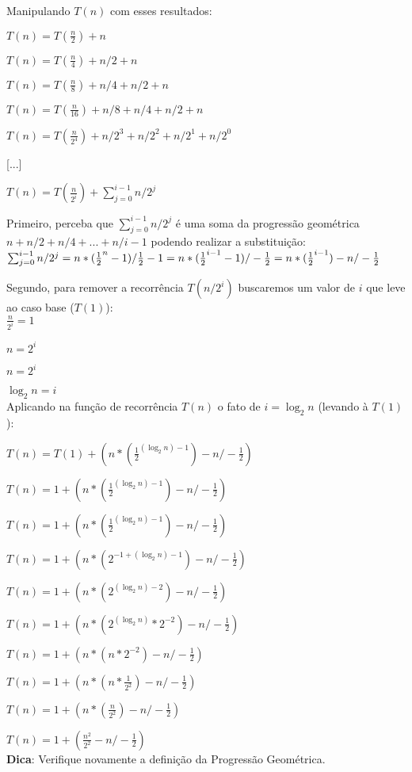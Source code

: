 \documentclass[a4paper, twocolumn]{article}
\theoremstyle{definition}
\begin{document}
Manipulando $T(n)$ com esses resultados:

$T(n) = T(\frac{n}{2}) + n$

$T(n) = T(\frac{n}{4}) + n/2 + n$

$T(n) = T(\frac{n}{8}) + n/4 + n/2 + n$

$T(n) = T(\frac{n}{16}) + n/8 + n/4 + n/2 + n$

$T(n) = T(\frac{n}{2^4}) + n/2^3 + n/2^2 + n/2^1 + n/2^0$

[...]

$T(n) = T(\frac{n}{2^i}) + \sum_{j=0}^{i-1} n/2^j$

Primeiro, perceba que $\sum_{j=0}^{i-1} n/2^j$ é uma soma da progressão geométrica $n + n/2 + n/4 + ... + n/i-1$ podendo realizar a substituição: \\

$ \sum_{j=0}^{i-1} n/2^j = n*(\frac{1}{2}^n - 1) / \frac{1}{2} - 1 \\
= n*(\frac{1}{2}^{i-1} - 1) / - \frac{1}{2} \\
= n*(\frac{1}{2}^{i-1}) - n / - \frac{1}{2}$


Segundo, para remover a recorrência $T(n/2^i)$ buscaremos um valor de $i$ que leve ao caso base ($T(1)$): \\

$\frac{n}{2^i} = 1$

$n = 2^i$

$n = 2^i$

$\log_2 n = i$ \\

Aplicando na função de recorrência $T(n)$ o fato de $i = \log_2 n$ (levando à $T(1)$):

$T(n) = T(1) + (n*(\frac{1}{2}^{(\log_2 n)-1}) - n / - \frac{1}{2})$

$T(n) = 1 + (n*(\frac{1}{2}^{(\log_2 n)-1}) - n / - \frac{1}{2})$

$T(n) = 1 + (n*(\frac{1}{2}^{(\log_2 n)-1}) - n / - \frac{1}{2})$

$T(n) = 1 + (n*(2^{-1 + (\log_2 n)-1}) - n / - \frac{1}{2})$

$T(n) = 1 + (n*(2^{(\log_2 n) - 2}) - n / - \frac{1}{2})$

$T(n) = 1 + (n*(2^{(\log_2 n)} * 2^{-2}) - n / - \frac{1}{2})$

$T(n) = 1 + (n*(n * 2^{-2}) - n / - \frac{1}{2})$

$T(n) = 1 + (n*(n * \frac{1}{2^2}) - n / - \frac{1}{2})$

$T(n) = 1 + (n*(\frac{n}{2^2}) - n / - \frac{1}{2})$

$T(n) = 1 + (\frac{n^2}{2^2} - n / - \frac{1}{2})$ \\

\textbf{Dica}: Verifique novamente a definição da Progressão Geométrica.
\end{document}
